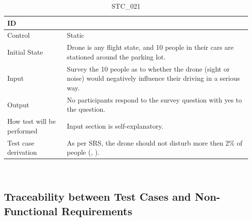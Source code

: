 \documentclass[12pt, titlepage]{article}
\begin{document}
\begin{table}[!h]
\begin{center}
\caption {STC\_021}
\label{tab:STC_021}
\begin{tabular}{ | m{3.2cm} | m{12.2cm} | } 
\hline
ID & \nameref{tab:STC_021} \\ 
\hline
Control & Static \\ 
\hline
Initial State & Drone is any flight state, and 10 people in their cars are stationed around the parking lot. \\ 
\hline
Input & Survey the 10 people as to whether the drone (sight or noise) would negatively influence their driving in a serious way. \\ 
\hline
Output &  No participants respond to the survey question with yes to the question. \\ 
\hline
How test will be performed & Input section is self-explanatory. \\ 
\hline
Test case derivation & As per SRS, the drone should not disturb more then 2\% of people (\nameref{SAFE_004}, \nameref{SAFE_001}).
 \\ 
\hline
\end{tabular}
\end{center}
\end{table}

\clearpage


\
\subsection{Traceability between Test Cases and Non-Functional Requirements}
\end{document}
